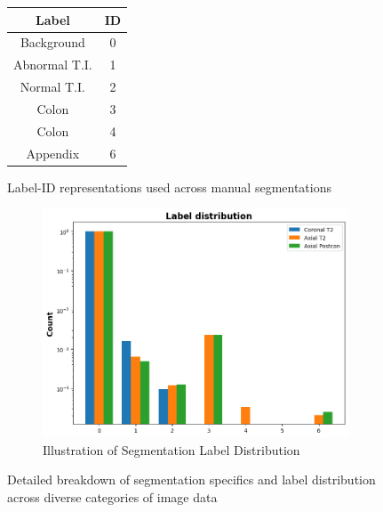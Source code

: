 \begin{figure}[htp]
    \centering
    \begin{subtable}[htp]{0.48\textwidth}
        \centering
        \begin{tabular}{|c|c|}
            \hline
            Label & ID \\
            \hline
            Background & 0 \\
            \hline
            Abnormal T.I. & 1 \\
            \hline
            Normal T.I. & 2 \\
            \hline
            Colon & 3 \\
            \hline
            Colon & 4 \\
            \hline
            Appendix & 6 \\
            \hline 
        \end{tabular}
        \caption{Label-ID representations used across manual segmentations}
        \label{tab:segmentation-label-id}
    \end{subtable}
    \hfill
    \begin{subfigure}[htp]{0.5\textwidth}
        \centering
        \includegraphics[width=\textwidth]{./figures/label_distribution.png}
        \caption{Illustration of Segmentation Label Distribution}
        \label{fig:label-distribution}
    \end{subfigure}
       \caption{Detailed breakdown of segmentation specifics and label distribution across diverse categories of image data}
       \label{fig:manual-segmentation}
\end{figure}

